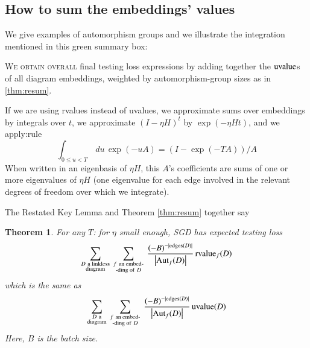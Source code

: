 \documentclass[anon,12pt]{colt2021} %
\newtheorem*{thm*}{Theorem}
\newcommand{\wabs}[1]{\left|#1\right|}
\newcommand{\Aut}{\text{\textnormal{Aut}}}
\newcommand{\uvalue}{\text{\textnormal{uvalue}}}
\newcommand{\rvalue}{\text{\textnormal{rvalue}}}
\newcommand{\edges}{\text{\textnormal{edges}}}
\begin{document}
    \subsection{How to sum the embeddings' values}                  \label{appendix:sum-embeddings}

        We give examples of automorphism groups and we illustrate the
        integration mentioned in this green summary box:
        \par
        \noindent
        \colorbox{moolime}{\parbox{\textwidth}{
            \textsc{We obtain overall} final testing loss expressions
            by adding together the $\uvalue$s of all diagram embeddings, weighted
            by automorphism-group sizes as in \ref{thm:resum}.
            \newline
            \par
            If we are using rvalues instead of uvalues, 
            we approximate sums over embeddings by
                integrals over $t$, we approximate $(I-\eta H)^t$ by $\exp(- \eta H t)$,
            and we apply:rule
                $$\int_{0\leq u<T} \, du \, \exp(-u A) = (I - \exp(-T A))/A$$ 
            When written in an eigenbasis of $\eta H$, this $A$'s coefficients are
            sums of one or more eigenvalues of $\eta H$ (one eigenvalue for each
            edge involved in the relevant degrees of freedom over which we
            integrate).  %
        }}

        The Restated Key Lemma and Theorem \ref{thm:resum} together say %
        \begin{thm*}
            For any $T$: for $\eta$ small enough, SGD has expected testing loss
            \begin{equation*}
                \sum_{\substack{D~\text{a linkless} \\ \text{diagram}}}
                ~
                \sum_{\substack{f~\text{an embed-} \\ \text{-ding of}~D}}
                ~
                \frac{(-B)^{-|\edges(D)|}}{\wabs{\Aut_f(D)}}
                \,
                {\rvalue_f}(D)
            \end{equation*}
            which is the same as
            \begin{equation*}
                \sum_{\substack{D~\text{a} \\ \text{diagram}}}
                ~
                \sum_{\substack{f~\text{an embed-} \\ \text{-ding of}~D}}
                ~
                \frac{(-B)^{-|\edges(D)|}}{\wabs{\Aut_f(D)}}
                \,
                {\uvalue}(D)
            \end{equation*}
            Here, $B$ is the batch size.
        \end{thm*}
\end{document}
